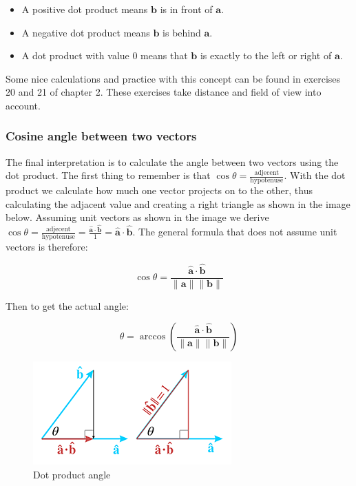 \documentclass[a4paper,11pt]{article}
\begin{document}
\begin{itemize}
	\item A positive dot product means $\textbf{b}$ is in front of $\textbf{a}$.
	\item A negative dot product means $\textbf{b}$ is behind $\textbf{a}$.
	\item A dot product with value 0 means that $\textbf{b}$ is exactly to the left or right of $\textbf{a}$.
\end{itemize}

Some nice calculations and practice with this concept can be found in exercises 20 and 21 of chapter 2. These exercises take distance and field of view into account.

\subsubsection{Cosine angle between two vectors}

The final interpretation is to calculate the angle between two vectors using the dot product. The first thing to remember is that $\cos\theta=\frac{\text{adjecent}}{\text{hypotenuse}}$. With the dot product we calculate how much one vector projects on to the other, thus calculating the adjacent value and creating a right triangle as shown in the image below. Assuming unit vectors as shown in the image we derive $\cos\theta=\frac{\text{adjecent}}{\text{hypotenuse}}=\frac{\hat{\textbf{a}}\cdot\hat{\textbf{b}}}{1}=\hat{\textbf{a}}\cdot\hat{\textbf{b}}$. The general formula that does not assume unit vectors is therefore:

$$\cos\theta=\frac{\hat{\textbf{a}}\cdot\hat{\textbf{b}}}{\|\textbf{a}\|\|\textbf{b}\|}$$

Then to get the actual angle:

$$\theta=\arccos\left(\frac{\hat{\textbf{a}}\cdot\hat{\textbf{b}}}{\|\textbf{a}\|\|\textbf{b}\|}\right)$$

\begin{figure}[H]
\centering
    \includegraphics{02_dot_angle}
\caption{Dot product angle}
\label{fig:dot-product-angle}
\end{figure}
\end{document}

